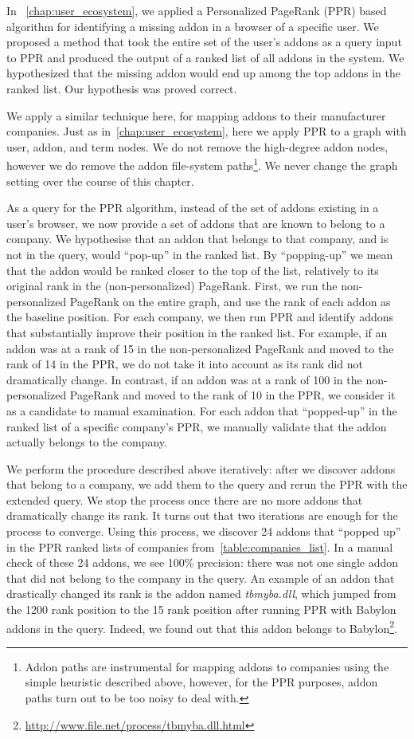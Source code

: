 \documentclass[ijoc,nonblindrev]{informs3} %
\numberwithin{equation}{subsection}
\begin{document}
In ~\autoref{chap:user_ecosystem}, we applied a Personalized PageRank (PPR) based algorithm for identifying a missing addon in a browser of a specific user. We proposed a method that took the entire set of the user's addons as a query input to PPR and produced the output of a ranked list of all addons in the system. We hypothesized that the missing addon would end up among the top addons in the ranked list. Our hypothesis was proved correct.

We apply a similar technique here, for mapping addons to their manufacturer companies. 
Just as in~\autoref{chap:user_ecosystem}, here we apply PPR to a graph with user, addon, and term nodes. We do not remove the high-degree addon nodes, however we do remove the addon file-system paths\footnote{Addon paths are instrumental for mapping addons to companies using the simple heuristic described above, however, for the PPR purposes, addon paths turn out to be too noisy to deal with.}. We never change the graph setting over the course of this chapter.

As a query for the PPR algorithm, instead of the set of addons existing in a user's browser, we now provide a set of addons that are known to belong to a company. We hypothesise that an addon that belongs to that company, and is not in the query, would ``pop-up'' in the ranked list. By ``popping-up'' we mean that the addon would be ranked closer to the top of the list, relatively to its original rank in the (non-personalized) PageRank. First, we run the non-personalized PageRank on the entire graph, and use the rank of each addon as the baseline position. For each company, we then run PPR and identify addons that substantially improve their position in the ranked list. For example, if an addon was at a rank of 15 in the non-personalized PageRank and moved to the rank of 14 in the PPR, we do not take it into account as its rank did not dramatically change. In contrast, if an addon was at a rank of 100 in the non-personalized PageRank and moved to the rank of 10 in the PPR, we consider it as a candidate to manual examination. For each addon that ``popped-up'' in the ranked list of a specific company's PPR, we manually validate that the addon actually belongs to the company.

We perform the procedure described above iteratively: after we discover addons that belong to a company, we add them to the query and rerun the PPR with the extended query. We stop the process once there are no more addons that dramatically change its rank. It turns out that two iterations are enough for the process to converge. Using this process, we discover 24 addons that ``popped up'' in the PPR ranked lists of companies from~\autoref{table:companies_list}. In a manual check of these 24 addons, we see 100\% precision: there was not one single addon that did not belong to the company in the query. An example of an addon that drastically changed its rank is the addon named \emph{tbmyba.dll}, which jumped from the 1200 rank position to the 15 rank position after running PPR with Babylon addons in the query. Indeed, we found out that this addon belongs to Babylon\footnote{\url{http://www.file.net/process/tbmyba.dll.html}}.
\end{document}
